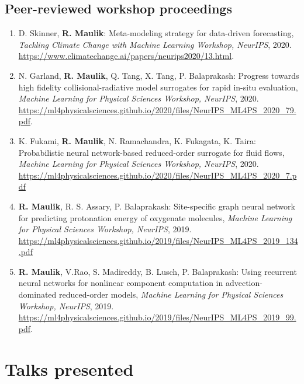 \documentclass[letterpaper]{article}
\begin{document}
\subsection*{Peer-reviewed workshop proceedings}

\begin{enumerate}

\item D. Skinner, \textbf{R. Maulik}: Meta-modeling strategy for data-driven forecasting, \textit{Tackling Climate Change with Machine Learning Workshop, NeurIPS}, 2020. \url{https://www.climatechange.ai/papers/neurips2020/13.html}. 

\item N. Garland, \textbf{R. Maulik}, Q. Tang, X. Tang, P. Balaprakash: Progress towards high fidelity collisional-radiative model surrogates for rapid in-situ evaluation, \textit{Machine Learning for Physical Sciences Workshop, NeurIPS}, 2020. \url{https://ml4physicalsciences.github.io/2020/files/NeurIPS_ML4PS_2020_79.pdf}.

\item K. Fukami, \textbf{R. Maulik}, N. Ramachandra, K. Fukagata, K. Taira: Probabilistic neural network-based reduced-order surrogate for fluid flows, \textit{Machine Learning for Physical Sciences Workshop, NeurIPS}, 2020. \url{https://ml4physicalsciences.github.io/2020/files/NeurIPS_ML4PS_2020_7.pdf}

\item \textbf{R. Maulik}, R. S. Assary, P. Balaprakash: Site-specific graph neural network for predicting protonation energy of oxygenate molecules, {\it Machine Learning for Physical Sciences Workshop, NeurIPS}, 2019. \url{https://ml4physicalsciences.github.io/2019/files/NeurIPS_ML4PS_2019_134.pdf}

\item \textbf{R. Maulik}, V.Rao, S. Madireddy, B. Lusch, P. Balaprakash: Using recurrent neural networks for nonlinear component computation in advection-dominated reduced-order models, \textit{Machine Learning for Physical Sciences Workshop, NeurIPS}, 2019. \url{https://ml4physicalsciences.github.io/2019/files/NeurIPS_ML4PS_2019_99.pdf}.

\end{enumerate}



\section*{Talks presented}
\end{document}
